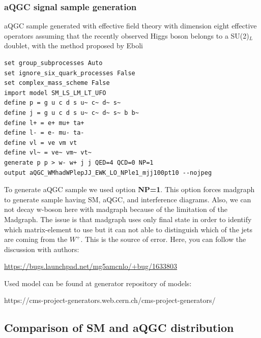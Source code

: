 \subsubsection{aQGC signal sample generation}
aQGC sample generated with effective field theory with dimension eight effective operators assuming that the recently observed Higgs boson belongs to a SU(2)$_{L}$ doublet, with the method proposed by Eboli~\cite{Belyaev:1998ih,Eboli:2006wa,Eboli:2000ad,Eboli:2003nq}
\begin{verbatim}
set group_subprocesses Auto
set ignore_six_quark_processes False
set complex_mass_scheme False
import model SM_LS_LM_LT_UFO
define p = g u c d s u~ c~ d~ s~ 
define j = g u c d s u~ c~ d~ s~ b b~
define l+ = e+ mu+ ta+
define l- = e- mu- ta-
define vl = ve vm vt
define vl~ = ve~ vm~ vt~
generate p p > w- w+ j j QED=4 QCD=0 NP=1
output aQGC_WMhadWPlepJJ_EWK_LO_NPle1_mjj100pt10 --nojpeg
\end{verbatim}
To generate aQGC sample we used option {\bf NP=1}. This option forces madgraph to generate sample having SM, aQGC, and interference diagrams.
Also, we can not decay w-boson here with madgraph because of the limitation of the Madgraph. The issue is that madgraph uses only final state in order to identify which matrix-element to use but it can not able to distinguish which of the jets are coming from the $W^+$. This is the source of error. Here, you can follow the discussion with authors:
\begin{sloppypar}
	\url{https://bugs.launchpad.net/mg5amcnlo/+bug/1633803}
\end{sloppypar}
Used model can be found at generator repository of models: 
\begin{sloppypar}
https://cms-project-generators.web.cern.ch/cms-project-generators/ 
\end{sloppypar}

\subsection{Comparison of SM and aQGC distribution}

